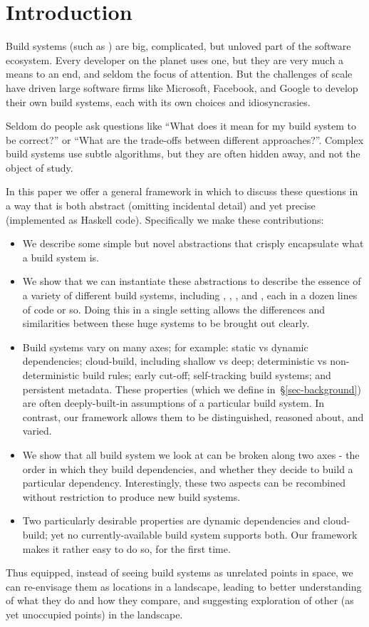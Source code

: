 \section{Introduction}\label{sec-intro}

Build systems (such as \Make) are big, complicated, but unloved part of
the software ecosystem.  Every developer on the planet uses one, but
they are very much a means to an end, and seldom the focus of
attention.  But the challenges of scale have driven large software firms
like Microsoft, Facebook, and Google to develop their own build
systems, each with its own choices and idiosyncrasies.

Seldom do people ask questions like ``What does it mean for my build
system to be correct?'' or ``What are the trade-offs between different
approaches?''.  Complex build systems use subtle algorithms, but they
are often hidden away, and not the object of study.

In this paper we offer a general framework in which to discuss these
questions in a way that is both abstract (omitting incidental detail)
and yet precise (implemented as Haskell code).  Specifically we make
these contributions:
\begin{itemize}
\item We describe some simple but novel abstractions that
crisply encapsulate what a build system is.
\item We show that we can instantiate
these abstractions to describe the essence of a variety of different
build systems, including \Make, \Shake, \Bazel, and \Excel, each in
a dozen lines of code or so.
Doing this in a single setting allows
the differences and similarities between these huge systems to be
brought out clearly.
\item Build systems vary on many axes;
for example: static vs dynamic dependencies; cloud-build, including
shallow vs deep; deterministic vs non-deterministic build rules;
early cut-off; self-tracking build systems; and persistent metadata.
These properties (which we define in~\S\ref{sec-background}) are often
deeply-built-in assumptions of a particular build system.
In contrast, our framework allows them to be distinguished,
reasoned about, and varied.
\item We show that all build system we look at can be broken along two axes - the order in which they build dependencies, and whether they decide to build a particular dependency. Interestingly, these two aspects can be recombined without restriction to produce new build systems.
\item Two particularly desirable properties are dynamic dependencies
and cloud-build; yet no currently-available build system supports
both.  Our framework makes it rather easy to do so, for the first
time.
\end{itemize}
Thus equipped, instead of seeing build systems as unrelated
points in space, we can re-envisage them as locations in a landscape,
leading to better understanding of what they do and how they compare,
and suggesting exploration of other (as yet unoccupied points) in the
landscape.


